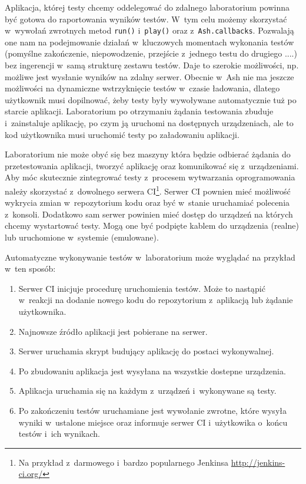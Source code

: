 \documentclass[brudnopis]{xmgr}
\begin{document}
Aplikacja, której testy chcemy oddelegować do zdalnego laboratorium powinna być gotowa do raportowania wyników testów. W~tym celu możemy skorzystać w~wywołań zwrotnych metod \texttt{run()} i~\texttt{play()} oraz z~\texttt{Ash.callbacks}. Pozwalają one nam na podejmowanie działań w~kluczowych momentach wykonania testów (pomyślne zakończenie, niepowodzenie, przejście z~jednego testu do drugiego ....) bez ingerencji w~samą strukturę zestawu testów. Daje to szerokie możliwości, np. możliwe jest wysłanie wyników na zdalny serwer. Obecnie w~Ash nie ma jeszcze możliwości na dynamiczne wstrzyknięcie testów w~czasie ładowania, dlatego użytkownik musi dopilnować, żeby testy były wywoływane automatycznie tuż po starcie aplikacji. Laboratorium po otrzymaniu żądania testowania zbuduje i~zainstaluje aplikację, po czym ją uruchomi na dostępnych urządzeniach, ale to kod użytkownika musi uruchomić testy po załadowaniu aplikacji.

Laboratorium nie może obyć się bez maszyny która będzie odbierać żądania do przetestowania aplikacji, tworzyć aplikację oraz komunikować się z~urządzeniami. Aby móc skutecznie zintegrować testy z~procesem wytwarzania oprogramowania należy skorzystać z~dowolnego serwera CI\footnote{ Na przykład z~darmowego i~bardzo popularnego Jenkinsa \url{ http://jenkins-ci.org/} }. Serwer CI pownien mieć możliwość wykrycia zmian w~repozytorium kodu oraz być w~stanie uruchamiać polecenia z~konsoli. Dodatkowo sam serwer powinien mieć dostęp do urządzeń na których chcemy wystartować testy. Mogą one być podpięte kablem do urządzenia (realne) lub uruchomione w~systemie (emulowane). 

Automatyczne wykonywanie testów w~laboratorium może wyglądać na przykład w~ten sposób:

\begin{enumerate}
  \item Serwer CI inicjuje procedurę uruchomienia testów. Może to nastąpić w~reakcji na dodanie nowego kodu do repozytorium z~aplikacją lub żądanie użytkownika.
  \item Najnowsze źródło aplikacji jest pobierane na serwer.
  \item Serwer uruchamia skrypt budujący aplikację do postaci wykonywalnej.
  \item Po zbudowaniu aplikacja jest wysyłana na wszystkie dostepne urządzenia.
  \item Aplikacja uruchamia się na każdym z~urządzeń i~wykonywane są testy.
  \item Po zakończeniu testów uruchamiane jest wywołanie zwrotne, które wysyła wyniki w~ustalone miejsce oraz informuje serwer CI i~użytkowika o~końcu testów i~ich wynikach.
\end{enumerate}
\end{document}
